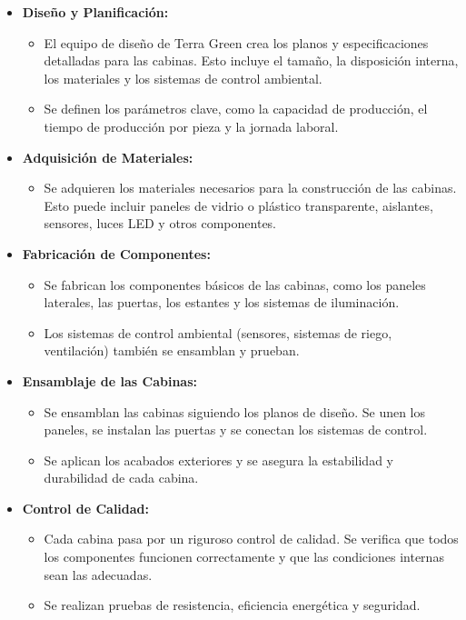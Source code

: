 \begin{itemize}
    \item \textbf{Diseño y Planificación:}
    \begin{itemize}
        \item El equipo de diseño de Terra Green crea los planos y especificaciones detalladas para las cabinas. Esto incluye el tamaño, la disposición interna, los materiales y los sistemas de control ambiental.
        \item Se definen los parámetros clave, como la capacidad de producción, el tiempo de producción por pieza y la jornada laboral.
    \end{itemize}
    
    \item \textbf{Adquisición de Materiales:}
    \begin{itemize}
        \item Se adquieren los materiales necesarios para la construcción de las cabinas. Esto puede incluir paneles de vidrio o plástico transparente, aislantes, sensores, luces LED y otros componentes.
    \end{itemize}
    
    \item \textbf{Fabricación de Componentes:}
    \begin{itemize}
        \item Se fabrican los componentes básicos de las cabinas, como los paneles laterales, las puertas, los estantes y los sistemas de iluminación.
        \item Los sistemas de control ambiental (sensores, sistemas de riego, ventilación) también se ensamblan y prueban.
    \end{itemize}
    
    \item \textbf{Ensamblaje de las Cabinas:}
    \begin{itemize}
        \item Se ensamblan las cabinas siguiendo los planos de diseño. Se unen los paneles, se instalan las puertas y se conectan los sistemas de control.
        \item Se aplican los acabados exteriores y se asegura la estabilidad y durabilidad de cada cabina.
    \end{itemize}
    
    \item \textbf{Control de Calidad:}
    \begin{itemize}
        \item Cada cabina pasa por un riguroso control de calidad. Se verifica que todos los componentes funcionen correctamente y que las condiciones internas sean las adecuadas.
        \item Se realizan pruebas de resistencia, eficiencia energética y seguridad.
    \end{itemize}
    

\end{itemize}
